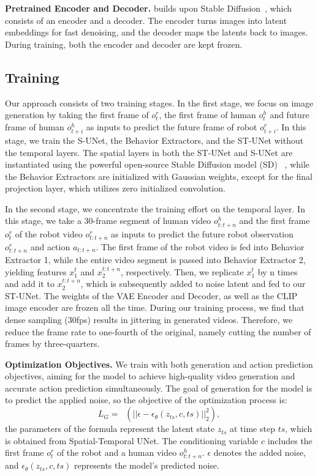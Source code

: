 \noindent\textbf{Pretrained Encoder and Decoder.} 
\system builds upon Stable Diffusion~\cite{rombach2022high}, which consists of an encoder and a decoder. The encoder turns images into latent embeddings for fast denoising, and the decoder maps the latents back to images. During training, both the encoder and decoder are kept frozen.



\subsection{Training}
\label{sec:training}
Our approach consists of two training stages. In the first stage, we focus on image generation by taking the first frame of $o^r_t$, the first frame of human $o^h_t$ and future frame of human $o^h_{t+i}$ as inputs to predict the future frame of robot $o^r_{t+i}$. In this stage, we train the S-UNet, the Behavior Extractors, and the ST-UNet without the temporal layers. The spatial layers in both the ST-UNet and S-UNet are instantiated using the powerful open-source Stable Diffusion model (SD) ~\cite{rombach2022high}, while the Behavior Extractors are initialized with Gaussian weights, except for the final projection layer, which utilizes zero initialized convolution.

In the second stage, we concentrate the training effort on the temporal layer. In this stage, we take a 30-frame segment of human video $o^h_{t:t+n}$ and the first frame $o^r_t$ of the robot video $o^r_{t:t+n}$ as inputs to predict the future robot observation $o^r_{t:t+n}$ and action $a_{t:t+n}$. The first frame of the robot video is fed into Behavior Extractor 1, while the entire video segment is passed into Behavior Extractor 2, yielding features $x_1^t$ and $x_2^{t:t+n}$, respectively. Then, we replicate $x_1^t$ by n times and add it to $x_2^{t:t+n}$, which is subsequently added to noise latent and fed to our ST-UNet.
The weights of the VAE Encoder and Decoder, as well as the CLIP image encoder are frozen all the time. During our training process, we find that dense sampling (30fps) results in jittering in generated videos. Therefore, we reduce the frame rate to one-fourth of the original, namely cutting the number of frames by three-quarters.

\noindent\textbf{Optimization Objectives.}
We train \system with both generation and action prediction objectives, aiming for the model to achieve high-quality video generation and accurate action prediction simultaneously. The goal of generation for the model is to predict the applied noise, so the objective of the optimization process is:
\begin{equation}
    L_G = \mathop{\mathbb{E}_{z_{ts},c,\epsilon,ts}}(||\epsilon - \epsilon_\theta(z_{ts},c,ts)||_2^2),
\end{equation}
the parameters of the formula represent the latent state $z_{ts}$ at time step $ts$, which is obtained from Spatial-Temporal UNet. The conditioning variable $c$ includes the first frame $o^r_t$ of the robot and a human video $o^h_{t:t+n}$. $\epsilon$ denotes the added noise, and $\epsilon_\theta(z_{ts},c,ts)$ represents the model's predicted noise.

